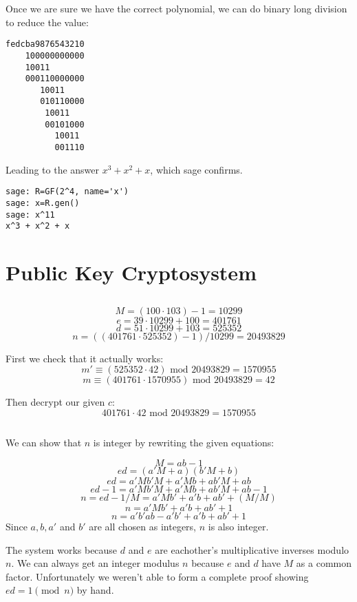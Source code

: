 \documentclass{article}
\begin{document}
Once we are sure we have the correct polynomial, we can do binary long division to reduce the value:

\begin{verbatim}
fedcba9876543210
    100000000000
    10011
    000110000000
       10011
       010110000
        10011
        00101000
          10011
          001110
\end{verbatim}

Leading to the answer $x^3 + x^2 + x$, which sage confirms.

\begin{verbatim}
sage: R=GF(2^4, name='x')
sage: x=R.gen()
sage: x^11
x^3 + x^2 + x
\end{verbatim}

\section{Public Key Cryptosystem}

\subsection{}
\[M = (100 \cdot 103)-1=10299 \]
\[e = 39 \cdot 10299 + 100 = 401761\]
\[d = 51 \cdot 10299 + 103 = 525352\]
\[n = ((401761 \cdot 525352)-1)/10299 = 20493829\]

First we check that it actually works:
\[m'\equiv (525352 \cdot 42) \mbox{ mod 20493829} = 1570955\]
\[m\equiv (401761 \cdot 1570955) \mbox{ mod 20493829} = 42\]

Then decrypt our given $c$:
\[ 401761 \cdot 42 \mbox{ mod 20493829} = 1570955 \]


\subsection{}
We can show that $n$ is integer by rewriting the given equations:

\[M=ab-1 \]
\[ed=(a'M+a)(b'M+b)\]
\[ed=a'Mb'M + a'Mb + ab'M + ab \]
\[ed-1=a'Mb'M + a'Mb + ab'M + ab-1 \]
\[n=ed-1/M=a'Mb' + a'b  + ab' + (M/M) \]
\[n=a'Mb' + a'b  + ab' + 1 \]
\[n=a'b'ab - a'b' + a'b  + ab' + 1 \]
Since $a, b, a'$ and $b'$ are all chosen as integers, $n$ is also integer.

The system works because $d$ and $e$ are eachother's multiplicative inverses modulo $n$.
We can always get an integer modulus $n$ because $e$ and $d$ have $M$ as a common factor.
Unfortunately we weren't able to form a complete proof showing $ed = 1 \pmod n$ by hand.
\end{document}
